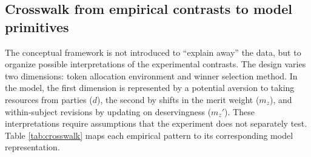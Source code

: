 \documentclass[11pt]{article}
\begin{document}
\subsection{Crosswalk from empirical contrasts to model primitives}

The conceptual framework is not introduced to ``explain away'' the data, but to organize possible interpretations of the experimental contrasts. The design varies two dimensions: token allocation environment and winner selection method. In the model, the first dimension is represented by a potential aversion to taking resources from parties ($d$), the second by shifts in the merit weight ($m_z$), and within-subject revisions by updating on deservingness ($m_z'$). These interpretations require assumptions that the experiment does not separately test. Table \ref{tab:crosswalk} maps each empirical pattern to its corresponding model representation.
\end{document}
